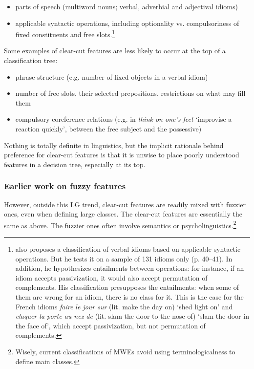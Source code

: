 \documentclass[output=paper]{langsci/langscibook}
\begin{document}
\begin{itemize}
\item parts of speech (multiword nouns; verbal, adverbial and adjectival idioms) 
\item applicable syntactic operations, 
including optionality vs. compulsoriness of fixed constituents and free slots.\footnote{\label{foonote-laporte-6} 
\citet[39]{Fraser1970} also proposes a  classification of verbal idioms based on applicable syntactic operations. But he tests it on a sample of 131 idioms only (p. 40--41). In addition, he hypothesizes entailments between operations: for instance, if an idiom accepts passivization, it would also accept permutation of complements. His classification presupposes the entailments: when some of them are wrong for an idiom, there is no class for it. This is the case for the French idioms \textit{faire le jour sur} (lit. make the day on) ‘shed light on’ and \textit{claquer la porte au nez de} (lit. slam the door to the nose of) ‘slam the door in the face of’, which accept passivization, but not permutation of complements.
}
\end{itemize}

\noindent Some examples of clear-cut features are less likely to occur at the top of a classification tree:

\begin{itemize}
\item phrase structure (e.g. number of fixed objects in a verbal idiom) 
\item number of free slots, their selected prepositions, restrictions on what may fill them
\item compulsory coreference relations (e.g. in \textit{think on one’s feet} ‘improvise a reaction quickly’, between the free subject and the possessive)
\end{itemize}

Nothing is totally definite in linguistics, but the implicit rationale behind preference for clear-cut features is that it is unwise to place poorly understood features in a decision tree, especially at its top.

\subsubsection{Earlier work on fuzzy features}
\label{earlierfuzzyfeat}

However, outside this LG trend, clear-cut features are readily mixed with fuzzier ones, even when defining large classes. The clear-cut features are essentially the same as above. The fuzzier ones often involve semantics or psycholinguistics.\footnote{Wisely, current classifications of MWEs avoid using terminologicalness to define main classes.}
 
\end{document}
